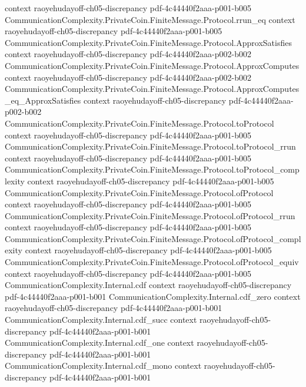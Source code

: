 \begin{theorem}
  {context}
  {raoyehudayoff-ch05-discrepancy}
  {pdf-4c44440f2aaa-p001-b005}
\proofstep
  {CommunicationComplexity.PrivateCoin.FiniteMessage.Protocol.rrun_eq}
  {context}
  {raoyehudayoff-ch05-discrepancy}
  {pdf-4c44440f2aaa-p001-b005}
\proofstep
  {CommunicationComplexity.PrivateCoin.FiniteMessage.Protocol.ApproxSatisfies}
  {context}
  {raoyehudayoff-ch05-discrepancy}
  {pdf-4c44440f2aaa-p002-b002}
\proofstep
  {CommunicationComplexity.PrivateCoin.FiniteMessage.Protocol.ApproxComputes}
  {context}
  {raoyehudayoff-ch05-discrepancy}
  {pdf-4c44440f2aaa-p002-b002}
\proofstep
  {CommunicationComplexity.PrivateCoin.FiniteMessage.Protocol.ApproxComputes_eq_ApproxSatisfies}
  {context}
  {raoyehudayoff-ch05-discrepancy}
  {pdf-4c44440f2aaa-p002-b002}
\proofstep
  {CommunicationComplexity.PrivateCoin.FiniteMessage.Protocol.toProtocol}
  {context}
  {raoyehudayoff-ch05-discrepancy}
  {pdf-4c44440f2aaa-p001-b005}
\proofstep
  {CommunicationComplexity.PrivateCoin.FiniteMessage.Protocol.toProtocol_rrun}
  {context}
  {raoyehudayoff-ch05-discrepancy}
  {pdf-4c44440f2aaa-p001-b005}
\proofstep
  {CommunicationComplexity.PrivateCoin.FiniteMessage.Protocol.toProtocol_complexity}
  {context}
  {raoyehudayoff-ch05-discrepancy}
  {pdf-4c44440f2aaa-p001-b005}
\proofstep
  {CommunicationComplexity.PrivateCoin.FiniteMessage.Protocol.ofProtocol}
  {context}
  {raoyehudayoff-ch05-discrepancy}
  {pdf-4c44440f2aaa-p001-b005}
\proofstep
  {CommunicationComplexity.PrivateCoin.FiniteMessage.Protocol.ofProtocol_rrun}
  {context}
  {raoyehudayoff-ch05-discrepancy}
  {pdf-4c44440f2aaa-p001-b005}
\proofstep
  {CommunicationComplexity.PrivateCoin.FiniteMessage.Protocol.ofProtocol_complexity}
  {context}
  {raoyehudayoff-ch05-discrepancy}
  {pdf-4c44440f2aaa-p001-b005}
\proofstep
  {CommunicationComplexity.PrivateCoin.FiniteMessage.Protocol.ofProtocol_equiv}
  {context}
  {raoyehudayoff-ch05-discrepancy}
  {pdf-4c44440f2aaa-p001-b005}
\proofstep
  {CommunicationComplexity.Internal.cdf}
  {context}
  {raoyehudayoff-ch05-discrepancy}
  {pdf-4c44440f2aaa-p001-b001}
\proofstep
  {CommunicationComplexity.Internal.cdf_zero}
  {context}
  {raoyehudayoff-ch05-discrepancy}
  {pdf-4c44440f2aaa-p001-b001}
\proofstep
  {CommunicationComplexity.Internal.cdf_succ}
  {context}
  {raoyehudayoff-ch05-discrepancy}
  {pdf-4c44440f2aaa-p001-b001}
\proofstep
  {CommunicationComplexity.Internal.cdf_one}
  {context}
  {raoyehudayoff-ch05-discrepancy}
  {pdf-4c44440f2aaa-p001-b001}
\proofstep
  {CommunicationComplexity.Internal.cdf_mono}
  {context}
  {raoyehudayoff-ch05-discrepancy}
  {pdf-4c44440f2aaa-p001-b001}

\end{theorem}
